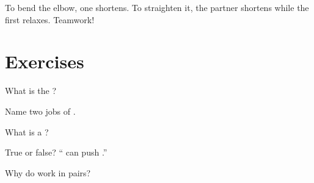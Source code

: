 \begin{example}[Pairs]\label{ex:g3:bones:pairs}
To bend the elbow, one  shortens. To straighten it, the
partner  shortens while the first relaxes. Teamwork!
\end{example}

\section{Exercises}

\begin{exercise}[$\star$]\label{exo:g3:bones:1}
What is the ?
\end{exercise}

\begin{exercise}[$\star$]\label{exo:g3:bones:2}
Name two jobs of .
\end{exercise}

\begin{exercise}[$\star$]\label{exo:g3:bones:3}
What is a ?
\end{exercise}

\begin{exercise}[$\star$]\label{exo:g3:bones:4}
True or false? `` can push .''
\end{exercise}

\begin{exercise}[$\star\star$]\label{exo:g3:bones:5}
Why do   work in pairs?
\end{exercise}

